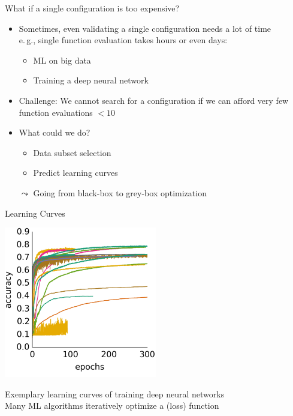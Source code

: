 \begin{frame}[c,fragile]{What if a single configuration is too expensive?}


\begin{itemize}
  \item Sometimes, even validating a single configuration needs a lot of time\\
  		e.$\,$g., single function evaluation takes hours or even days:
  \begin{itemize}
    \item ML on big data
    \item Training a deep neural network  
  \end{itemize}
  \pause
  \item Challenge: We cannot search for a configuration if we can afford very few function evaluations $< 10$
  \pause
  \item \hands What could we do?
  \pause
  \begin{itemize}
    \item Data subset selection
    \item Predict learning curves
  \end{itemize}
  \item[$\leadsto$] Going from black-box to grey-box optimization
\end{itemize}

\end{frame}

\begin{frame}[c,fragile]{Learning Curves}

\centering
\includegraphics[width=0.5\textwidth]{images/learning_curves}

Exemplary learning curves of training deep neural networks\\
Many ML algorithms iteratively optimize a (loss) function

\end{frame}

